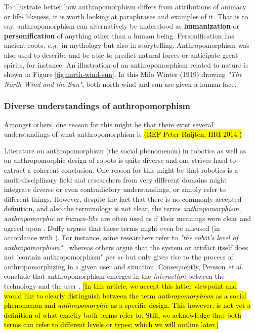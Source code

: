 \documentclass{frontiersSCNS} %
\newcommand{\eg}{{\textit{e.g.~}}}
\begin{document}
To illustrate better how anthropomorphism differs from attributions of animacy or life-
likeness, it is worth looking at paraphrases and examples of it. That is to say, 
anthropomorphism can alternatively be understood as \textbf{humanization} or 
\textbf{personification} of anything other than a human being. Personification has 
ancient roots, \eg in mythology but also in storytelling. Anthropomorphism was also 
used to describe and be able to predict natural forces or anticipate great spirits, for 
instance. An illustration of an anthropomorphism related to nature is shown in Figure 
\ref{fig:north-wind-sun}. In this Milo Winter (1919) drawing \textit{"The North Wind 
and the Sun"}, both north wind and sun are given a human face.


\subsubsection{Diverse understandings of anthropomorphism\\}

Amongst others, one reason for this might be that there exist several understandings of what anthropomorphism is \hl{(REF Peter Ruijten, HRI 2014.)}

Literature on anthropomorphism (the social phenomenon) in robotics as well as on
anthropomorphic design of robots is quite diverse and one strives hard to
extract a coherent conclusion. One reason for this might be that robotics is a
multi-disciplinary field and researchers from very different domains might
integrate diverse or even contradictory understandings, or simply refer to
different things. However, despite the fact that there is no commonly accepted
definition, and also the terminology is not clear, the terms
\textit{anthropomorphism}, \textit{anthropomorphic} or \textit{human-like} are
often used as if their meanings were clear and agreed upon
\cite{persson_anthropomorphism_2000}. Duffy \cite{duffy_anthropomorphism_2002}
argues that these terms might even be misused (in accordance with
\cite{epley_when_2008}). For instance, some researchers refer to \textit{"the
robot's level of anthropomorphism"} \cite{bartneck_is_2007}, whereas others
argue that the system or artifact itself does not "contain anthropomorphism"
\textit{per se} but only gives rise to the process of anthropomorphizing in a
given user and situation. Consequently, Persson \textit{et al.} conclude that
anthropomorphism emerges in the \textit{interaction} between the technology and
the user \cite{persson_anthropomorphism_2000}.  \hl{[In this article, we accept
this latter viewpoint and would like to clearly distinguish between the term
\textit{anthropomorphism} as a social phenomenon and \textit{anthropomorphic} as
a specific design. This however, is not yet a definition of what exactly both
terms refer to. Still, we acknowledge that both terms can refer to different
levels or types; which we will outline later.]} 
\end{document}
